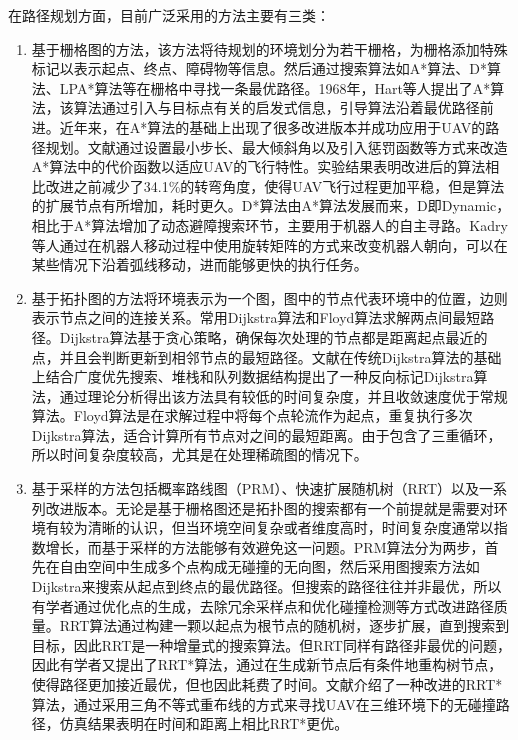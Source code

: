 在路径规划方面，目前广泛采用的方法主要有三类：
\begin{enumerate}[topsep = 0 pt, itemsep= 0 pt, parsep=0pt, partopsep=0pt, leftmargin=44pt, itemindent=0pt, labelsep=6pt, label=(\arabic*)]
	\item 基于栅格图的方法，该方法将待规划的环境划分为若干栅格，为栅格添加特殊标记以表示起点、终点、障碍物等信息。然后通过搜索算法如A*算法、D*算法、LPA*算法等在栅格中寻找一条最优路径。1968年，Hart等人提出了A*算法\cite{hartFormalBasisHeuristic1968}，该算法通过引入与目标点有关的启发式信息，引导算法沿着最优路径前进。近年来，在A*算法的基础上出现了很多改进版本并成功应用于UAV的路径规划。文献\cite{liImprovedASTARAlgorithm2024}通过设置最小步长、最大倾斜角以及引入惩罚函数等方式来改造A*算法中的代价函数以适应UAV的飞行特性。实验结果表明改进后的算法相比改进之前减少了34.1\%的转弯角度，使得UAV飞行过程更加平稳，但是算法的扩展节点有所增加，耗时更久。D*算法由A*算法发展而来，D即Dynamic，相比于A*算法增加了动态避障搜索环节，主要用于机器人的自主寻路。Kadry等人通过在机器人移动过程中使用旋转矩阵的方式来改变机器人朝向，可以在某些情况下沿着弧线移动，进而能够更快的执行任务\cite{kadryPathOptimizationDstar2022}。
	\item 基于拓扑图的方法将环境表示为一个图，图中的节点代表环境中的位置，边则表示节点之间的连接关系。常用Dijkstra\cite{dijkstraNoteTwoProblems2022}算法和Floyd算法\cite{floyd1962algorithm}求解两点间最短路径。Dijkstra算法基于贪心策略，确保每次处理的节点都是距离起点最近的点，并且会判断更新到相邻节点的最短路径。文献\cite{zhuNewAlgorithmBased2021}在传统Dijkstra算法的基础上结合广度优先搜索、堆栈和队列数据结构提出了一种反向标记Dijkstra算法，通过理论分析得出该方法具有较低的时间复杂度，并且收敛速度优于常规算法。Floyd算法是在求解过程中将每个点轮流作为起点，重复执行多次Dijkstra算法，适合计算所有节点对之间的最短距离。由于包含了三重循环，所以时间复杂度较高，尤其是在处理稀疏图的情况下。
	\item 基于采样的方法包括概率路线图（PRM）\cite{geraertsComparativeStudyProbabilistic2004}、快速扩展随机树（RRT）\cite{lavalleRandomizedKinodynamicPlanning2001}以及一系列改进版本。无论是基于栅格图还是拓扑图的搜索都有一个前提就是需要对环境有较为清晰的认识，但当环境空间复杂或者维度高时，时间复杂度通常以指数增长，而基于采样的方法能够有效避免这一问题。PRM算法分为两步，首先在自由空间中生成多个点构成无碰撞的无向图，然后采用图搜索方法如Dijkstra来搜索从起点到终点的最优路径。但搜索的路径往往并非最优，所以有学者通过优化点的生成，去除冗余采样点和优化碰撞检测等方式改进路径质量\cite{liSmartVehiclePath2022}。RRT算法通过构建一颗以起点为根节点的随机树，逐步扩展，直到搜索到目标，因此RRT是一种增量式的搜索算法。但RRT同样有路径非最优的问题，因此有学者又提出了RRT*算法，通过在生成新节点后有条件地重构树节点，使得路径更加接近最优，但也因此耗费了时间。文献\parencite{fusicImprovedRRTAlgorithmBased2024}介绍了一种改进的RRT*算法，通过采用三角不等式重布线的方式来寻找UAV在三维环境下的无碰撞路径，仿真结果表明在时间和距离上相比RRT*更优。
\end{enumerate}

